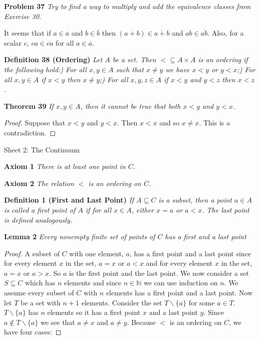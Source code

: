\documentclass{article}
\begin{document}
\begin{flushleft}
\textbf{Problem 37}
\textsl{Try to find a way to multiply and add the equivalence classes from Exercise 30.}\newline

It seems that if $a \in \overline{a}$ and $b \in \overline{b}$ then $(a+b) \in \overline{a+b}$ and $ab \in \overline{ab}$. Also, for a scalar $c$, $ca \in \overline{ca}$ for all $a \in \overline{a}$.\newline

\textbf{Definition 38 (Ordering)}
\textsl{Let $A$ be a set. Then $< \subseteq A \times A$ is an ordering if the following hold:) For all $x,y \in A$ such that $x \neq y$ we have $x < y$ or $y < x$;) For all $x,y \in A$ if $x < y$ then $x \neq y$;) For all $x,y,z \in A$ if $x < y$ and $y < z$ then $x < z$.}\newline

\textbf{Theorem 39}
\textsl{If $x,y \in A$, then it cannot be true that both $x < y$ and $y < x$.}
\begin{proof}
Suppose that $x<y$ and $y<x$. Then $x<x$ and so $x \neq x$. This is a contradiction.
\end{proof}

\newpage

\Large

Sheet 2: The Continuum\newline

\normalsize

\textbf{Axiom 1}
\textsl{There is at least one point in $C$.}\newline

\textbf{Axiom 2}
\textsl{The relation $<$ is an ordering on $C$.}\newline

\textbf{Definition 1 (First and Last Point)}
\textsl{If $A \subseteq C$ is a subset, then a point $a \in A$ is called a first point of $A$ if for all $x \in A$, either $x = a$ or $a < x$. The last point is defined analogously.}\newline

\textbf{Lemma 2}
\textsl{Every nonempty finite set of points of $C$ has a first and a last point}
\begin{proof}
A subset of $C$ with one element, $a$, has a first point and a last point since for every element $x$ in the set, $a=x$ or $a<x$ and for every element $x$ in the set, $a=x$ or $a>x$. So $a$ is the first point and the last point. We now consider a set $S \subseteq C$ which has $n$ elements and since $n \in \mathbb{N}$ we can use induction on $n$. We assume every subset of $C$ with $n$ elements has a first point and a last point. Now let $T$ be a set with $n+1$ elements. Consider the set $T \backslash \{a\}$ for some $a \in T$. $T \backslash \{a\}$ has $n$ elements so it has a first point $x$ and a last point $y$. Since $a \notin T \backslash \{a\}$ we see that $a \neq x$ and $a \neq y$. Because $<$ is an ordering on $C$, we have four cases:\newline


\end{proof}
\end{flushleft}
\end{document}
